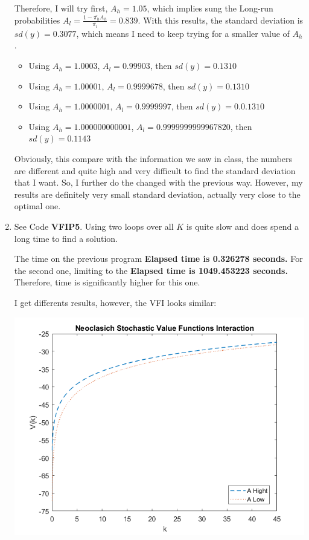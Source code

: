 \documentclass[12pt]{article}%
\begin{document}
\begin{enumerate}
	 Therefore, I will try first, $A_h=1.05$, which implies sung the Long-run probabilities $A_l=\frac{1-\bar{\pi_h}A_h}{\bar{\pi_l}}= 0.839$. With this results, the standard deviation is $sd(y)=0.3077$, which means I need to keep trying for a smaller value of $A_h$.
	 
	 \begin{itemize}
	 	\item Using $A_h=1.0003$, $A_l=0.99903$, then  $sd(y)=0.1310$
	 	\item Using $A_h=1.00001$, $A_l= 0.9999678$, then  $sd(y)=0.1310$
	 	\item Using $A_h=1.0000001$, $A_l= 0.9999997$, then  $sd(y)=0.0.1310$
	 	\item Using $A_h=1.000000000001$, $A_l=  0.9999999999967820$, then  $sd(y)=0.1143$
	 \end{itemize}
 
 Obviously, this compare with the information we saw in class, the numbers are different and quite high and very difficult to find the standard deviation that I want. So, I further do the changed with the previous way. However, my results are definitely very small standard deviation, actually very close to the optimal one.  
 
	 
	
	\item See Code \textbf{VFIP5}. Using two loops over all $K$ is quite slow and does spend a long time to find a solution. 
	
	The time on the previous program \textbf{Elapsed time is 0.326278 seconds.}
	For the second one, limiting to the  \textbf{Elapsed time is 1049.453223 seconds.} Therefore, time is significantly higher for this one. 
	
 I get differents results, however, the VFI looks similar: 
	
	\begin{center}
		\includegraphics[width=1\linewidth]{VFP5}
	\end{center}
	
	
	
\end{enumerate}

\strut

\onehalfspacing
\end{document}
